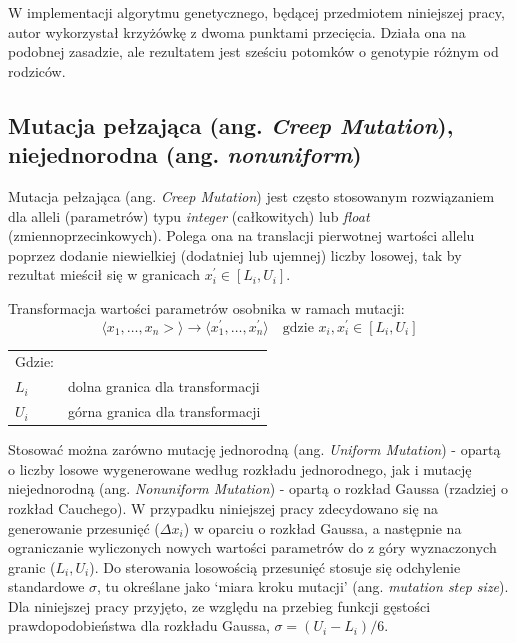 \documentclass[a4paper,12pt]{article}
\numberwithin{figure}{section}
\begin{document}
    \bigskip

    W implementacji algorytmu genetycznego, będącej przedmiotem niniejszej pracy, autor wykorzystał krzyżówkę z dwoma punktami przecięcia. Działa ona na podobnej zasadzie, ale rezultatem jest sześciu potomków o genotypie różnym od rodziców.

    \subsection{Mutacja pełzająca (ang. \textit{Creep Mutation}), niejednorodna (ang. \textit{nonuniform})}

    Mutacja pełzająca (ang. \textit{Creep Mutation}) jest często stosowanym rozwiązaniem dla alleli (parametrów) typu \textit{integer} (całkowitych) lub \textit{float} (zmiennoprzecinkowych). Polega ona na translacji pierwotnej wartości allelu poprzez dodanie niewielkiej (dodatniej lub ujemnej) liczby losowej, tak by rezultat mieścił się w granicach $x_{i}^{'} \in [L_{i}, U_{i}]$\cite{IntroductionToEvolutionaryComputing2015}.

    \bigskip

    \noindent
    \begin{minipage}[H]{\textwidth}
        \setlength\parindent{17pt} Transformacja wartości parametrów osobnika w ramach mutacji: \\
        \begin{equation}
            \label{eq:mutation_transformation}
            \langle x_{1},\dotsc,x_{n}> \rangle \to \langle x_{1}^{'},\dotsc,x_{n}^{'} \rangle \quad \text{gdzie } x_{i}, x_{i}^{'} \in [L_{i}, U_{i}]
        \end{equation}
        \smallskip
        \begin{tabular}{p{}p{}}
            Gdzie: \\
            $L_{i}$ & dolna granica dla transformacji \\
            $U_{i}$ & górna granica dla transformacji \\
        \end{tabular}
    \end{minipage}

    \bigskip

    Stosować można zarówno mutację jednorodną (ang. \textit{Uniform Mutation}) - opartą o liczby losowe wygenerowane według rozkładu jednorodnego, jak i mutację niejednorodną (ang. \textit{Nonuniform Mutation}) - opartą o rozkład Gaussa (rzadziej o rozkład Cauchego)\cite{IntroductionToEvolutionaryComputing2015}. W przypadku niniejszej pracy zdecydowano się na generowanie przesunięć ($\Delta x_{i}$) w oparciu o rozkład Gaussa, a następnie na ograniczanie wyliczonych nowych wartości parametrów do z góry wyznaczonych granic ($L_{i}, U_{i}$). Do sterowania losowością przesunięć stosuje się odchylenie standardowe $\sigma$, tu określane jako `miara kroku mutacji' (ang. \textit{mutation step size}). Dla niniejszej pracy przyjęto, ze względu na przebieg funkcji gęstości prawdopodobieństwa dla rozkładu Gaussa, $\sigma = (U_{i} - L_{i}) / 6$.
\end{document}

